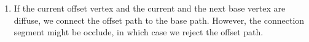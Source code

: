 \documentclass[10pt]{article}
\begin{document}
\begin{itemize}
\begin{enumerate}
  		\item If the current offset vertex and the current and the next base vertex are diffuse, we connect the offset path to the base path.  However, the connection segment might be occlude, in which case we reject the offset path.  		
  	\end{enumerate}
  \end{itemize}

  
    
\end{document}
